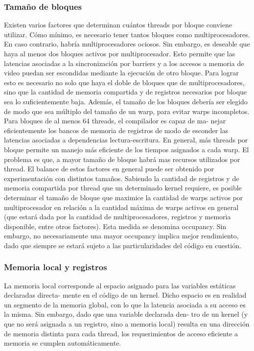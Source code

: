 \documentclass[a4paper,10pt]{report}
\begin{document}
\subsubsection{Tamaño de bloques}
Existen varios factores que determinan cuántos threads por bloque conviene utilizar. Cómo mínimo,
es necesario tener tantos bloques como multiprocesadores. En caso contrario, habría multiprocesadores
ociosos. Sin embargo, es deseable que haya al menos dos bloques activos por multiprocesador. Esto
permite que las latencias asociadas a la sincronización por barriers y a los accesos a memoria de video
puedan ser escondidas mediante la ejecución de otro bloque. Para lograr esto es necesario no solo que
haya el doble de bloques que de multiprocesadores, sino que la cantidad de memoria compartida y de
registros necesarios por bloque sea lo suficientemente baja.
Además, el tamaño de los bloques debería ser elegido de modo que sea múltiplo del tamaño de un
warp, para evitar warps incompletos. Para bloques de al menos 64 threads, el compilador es capaz de ma-
nejar eficientemente los bancos de memoria de registros de modo de esconder las latencias asociadas a
dependencias lectura-escritura. En general, más threads por bloque permite un manejo más eficiente de
los tiempos asignados a cada warp. El problema es que, a mayor tamaño de bloque habrá mas recursos
utilizados por thread. El balance de estos factores en general puede ser obtenido por experimentación
con distintos tamaños.
Sabiendo la cantidad de registros y de memoria compartida por thread que un determinado kernel
requiere, es posible determinar el tamaño de bloque que maximice la cantidad de warps activos por
multiprocesador en relación a la cantidad máxima de warps activos en general (que estará dada por la
cantidad de multiprocesadores, registros y memoria disponible, entre otros factores). Esta medida se
denomina occupancy. Sin embargo, no necesariamente una mayor occupancy implica mejor rendimiento,
dado que siempre se estará sujeto a las particularidades del código en cuestión.


\subsubsection{Memoria local y registros}

La memoria local corresponde al espacio asignado para las variables estáticas declaradas directa-
mente en el código de un kernel. Dicho espacio es en realidad un segmento de la memoria global, con
lo que la latencia asociada a su acceso es la misma. Sin embargo, dado que una variable declarada den-
tro de un kernel (y que no será asignada a un registro, sino a memoria local) resulta en una dirección
de memoria distinta para cada thread, los requerimientos de acceso eficiente a memoria se cumplen
automáticamente.
\end{document}
